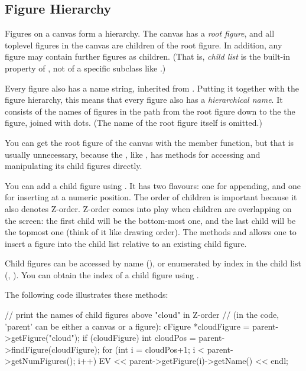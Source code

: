 \subsection{Figure Hierarchy}
\label{sec:graphics:figure-hierarchy}

Figures on a canvas form a hierarchy. The canvas has a \textit{root
figure}, and all toplevel figures in the canvas are children of the root
figure. In addition, any figure may contain further figures as children.
(That is, \textit{child list} is the built-in property of ,
not of a specific subclass like .)

Every figure also has a name string, inherited from .
Putting it together with the figure hierarchy, this means that every figure
also has a \textit{hierarchical name}. It consists of the names of figures
in the path from the root figure down to the the figure, joined with dots.
(The name of the root figure itself is omitted.)

You can get the root figure of the canvas with the 
member function, but that is usually unnecessary, because the
, like , has methods for accessing and
manipulating its child figures directly.

You can add a child figure using . It has two flavours: one
for appending, and one for inserting at a numeric position. The order of
children is important because it also denotes Z-order. Z-order comes into
play when children are overlapping on the screen: the first child will be
the bottom-most one, and the last child will be the topmost one (think of
it like drawing order). The methods  and
 allows one to insert a figure into the child list
relative to an existing child figure.

Child figures can be accessed by name (), or
enumerated by index in the child list (,
). You can obtain the index of a child figure using
.

The following code illustrates these methods:

\begin{cpp}
// print the names of child figures above "cloud" in Z-order
// (in the code, 'parent' can be either a canvas or a figure):
cFigure *cloudFigure = parent->getFigure("cloud");
if (cloudFigure) {
    int cloudPos = parent->findFigure(cloudFigure);
    for (int i = cloudPos+1; i < parent->getNumFigures(); i++)
        EV << parent->getFigure(i)->getName() << endl;
}
\end{cpp}

